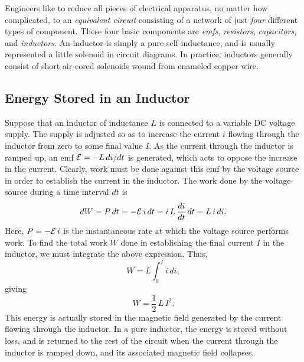 Engineers 
like to reduce all pieces of electrical apparatus, no matter how complicated, to
an {\em equivalent circuit}\/ consisting of a network of
just {\em four}\/ different types
of component. These four basic components are {\em emfs}, {\em resistors}, {\em capacitors},
and {\em inductors}. An inductor is simply a pure self inductance, and is usually
represented a little solenoid in circuit diagrams. In practice, inductors
generally consist of short air-cored solenoids wound from enameled copper wire. 

\subsection{Energy Stored in an Inductor}\label{s10.3}
Suppose that an inductor of inductance $L$ is connected to a
variable DC voltage supply.
The supply is adjusted so as to increase the current $i$ flowing through
the inductor from zero to some final value $I$. As the current through the
inductor is ramped up, an emf ${\cal E} = - L\,d i/dt$
is generated, which acts to oppose the increase in the current. Clearly, work must
be done against this emf by the voltage source in order to establish the
current in the inductor. The work done by the voltage source during a
time interval $d t$ is
\begin{equation}
d W = P\,dt = -{\cal E}\,i\,dt
= i\,L\,\frac{d i}{d t} \,d t = L\,i\,di.
\end{equation}
Here, $P=-{\cal E}\,i$ is the instantaneous rate at which the voltage source performs work.
To find the total work $W$ done in establishing the final current $I$ in the
inductor, we must integrate the above expression. Thus,
\begin{equation}
W = L\int_0^I i\,di,
\end{equation}
giving
\begin{equation}\label{e10.18}
W  = \frac{1}{2}\,L\,I^2.
\end{equation}
This energy is actually stored in the magnetic field generated by the current
flowing through the inductor. In a pure inductor, the energy is stored without
loss, and is returned to the rest of the circuit when the current through the
inductor is ramped down, and its associated magnetic field collapses. 

